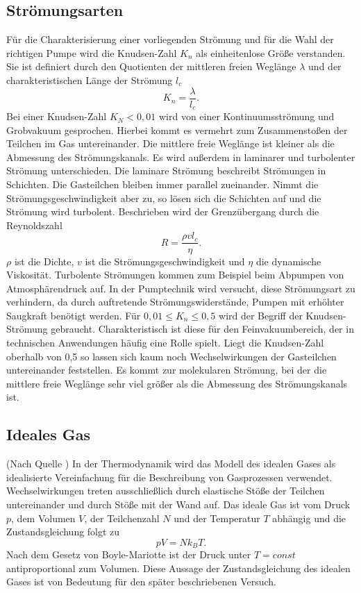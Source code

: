 \subsection{Strömungsarten}
Für die Charakterisierung einer vorliegenden Strömung und für die Wahl der richtigen Pumpe wird die Knudsen-Zahl $K_n$ als einheitenlose Größe verstanden.
Sie ist definiert durch den Quotienten der mittleren freien Weglänge $\lambda$ und der charakteristischen Länge der Strömung $l_c$
\begin{equation}
  K_n=\frac{\lambda}{l_c}.
\end{equation}
Bei einer Knudsen-Zahl $K_N < 0,01$ wird von einer Kontinuumsströmung und Grobvakuum gesprochen. Hierbei kommt es vermehrt zum Zusammenstoßen der Teilchen im Gas
untereinander. Die mittlere freie Weglänge ist kleiner als die Abmessung des Strömungskanals.
Es wird außerdem in laminarer und turbolenter Strömung unterschieden.
Die laminare Strömung beschreibt Strömungen in Schichten. Die Gasteilchen bleiben immer parallel zueinander.
Nimmt die Strömungsgeschwindigkeit aber zu, so lösen sich die Schichten auf und die Strömung wird turbolent.
Beschrieben wird der Grenzübergang durch die Reynoldszahl
\begin{equation}
  R=\frac{\rho v l_c}{\eta}.
\end{equation}
$\rho$ ist die Dichte, $v$ ist die Strömungsgeschwindigkeit und $\eta$ die dynamische Viskosität.
Turbolente Strömungen kommen zum Beispiel beim Abpumpen von Atmosphärendruck auf.
In der Pumptechnik wird versucht, diese Strömungsart zu verhindern, da durch auftretende Strömungswiderstände, Pumpen mit erhöhter Saugkraft benötigt werden.\newline
Für $ 0,01 \leq K_n \leq 0,5$ wird der Begriff der Knudsen-Strömung gebraucht.
Charakteristisch ist diese für den Feinvakuumbereich, der in technischen Anwendungen häufig eine Rolle spielt.\newline
Liegt die Knudsen-Zahl oberhalb von 0,5 so lassen sich kaum noch Wechselwirkungen der Gasteilchen untereinander feststellen.
Es kommt zur molekularen Strömung, bei der die mittlere freie Weglänge sehr viel größer als die Abmessung des Strömungskanals ist.
\subsection{Ideales Gas}
(Nach Quelle \cite{vakuum2})
In der Thermodynamik wird das Modell des idealen Gases als idealisierte Vereinfachung für die Beschreibung von Gasprozessen verwendet.
Wechselwirkungen treten ausschließlich durch elastische Stöße der Teilchen untereinander und durch Stöße mit der Wand auf.
Das ideale Gas ist vom Druck $p$, dem Volumen $V$, der Teilchenzahl $N$ und der Temperatur $T$ abhängig und die Zustandsgleichung
folgt zu
\begin{equation}
pV=N k_B T.
\label{eq:idealesgas}
\end{equation}
Nach dem Gesetz von Boyle-Mariotte ist der Druck unter $T=const$ antiproportional zum Volumen.
Diese Aussage der Zustandsgleichung des idealen Gases ist von Bedeutung für den später beschriebenen Versuch.
\newpage
